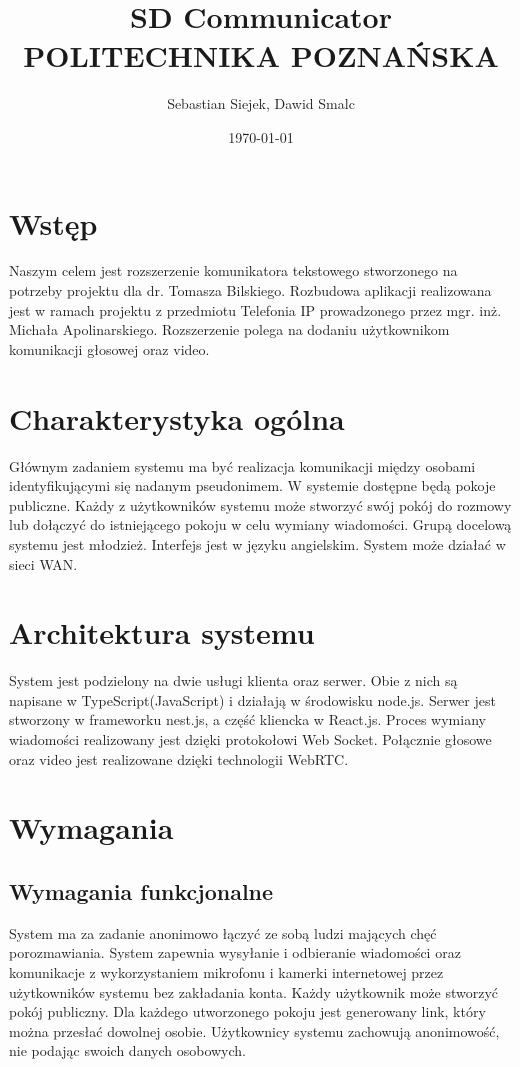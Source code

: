 \documentclass{article}
\title{\textbf{SD Communicator} \\ POLITECHNIKA POZNAŃSKA}
\author{Sebastian Siejek, Dawid Smalc}
\date{\today}
\begin{document}
\maketitle

\tableofcontents{}

\section{Wstęp}
Naszym celem jest rozszerzenie komunikatora tekstowego stworzonego na potrzeby projektu dla dr. Tomasza Bilskiego. Rozbudowa aplikacji realizowana jest w ramach projektu z przedmiotu Telefonia IP prowadzonego przez mgr. inż. Michała Apolinarskiego. Rozszerzenie polega na dodaniu użytkownikom komunikacji głosowej oraz video.

\section{Charakterystyka ogólna}
Głównym zadaniem systemu ma być realizacja komunikacji między osobami identyfikującymi się nadanym pseudonimem. W systemie dostępne będą pokoje publiczne. Każdy z użytkowników systemu może stworzyć swój pokój do rozmowy lub dołączyć do istniejącego pokoju w celu wymiany wiadomości. Grupą docelową systemu jest młodzież. Interfejs jest w języku angielskim. System może działać w sieci WAN.

\section{Architektura systemu}
System jest podzielony na dwie usługi klienta oraz serwer. Obie z nich są napisane w TypeScript(JavaScript) i działają w środowisku node.js. Serwer jest stworzony w frameworku nest.js, a część kliencka w React.js. Proces wymiany wiadomości realizowany jest dzięki protokołowi Web Socket. Połącznie głosowe oraz video jest realizowane dzięki technologii WebRTC.

\section{Wymagania}
\subsection{Wymagania funkcjonalne}
System ma za zadanie anonimowo łączyć ze sobą ludzi mających chęć porozmawiania. System zapewnia wysyłanie i odbieranie wiadomości oraz komunikacje z wykorzystaniem mikrofonu i kamerki internetowej przez użytkowników systemu bez zakładania konta. Każdy użytkownik może stworzyć pokój publiczny. Dla każdego utworzonego pokoju jest generowany link, który można przesłać dowolnej osobie. Użytkownicy systemu zachowują anonimowość, nie podając swoich danych osobowych.
\end{document}
